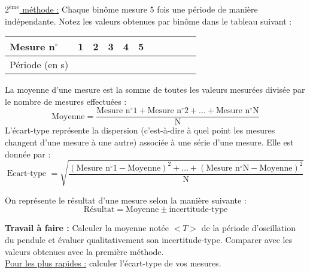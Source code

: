 \underline{$2^{\text{ème}}$ méthode :} Chaque binôme mesure 5 fois une période de manière indépendante. Notez les valeurs obtenues par binôme dans le tableau suivant :
\\

\begin{tabular}{|l|C{0.14}|C{0.14}|C{0.14}|C{0.14}|C{0.14}|C{0.14}|C{0.14}|C{0.14}|C{0.14}|C{0.14}|}
\hline
     Mesure n$^{\circ}$ & 1 & 2 & 3 & 4 & 5 \\
     \hline
     Période (en s) & & & & & \\
     \hline
\end{tabular}
\newline
\newline

\begin{tcolorbox}[colback=blue!5!white,colframe=white!75!black,title=Document 1 :]
La moyenne d'une mesure est la somme de toutes les valeurs mesurées divisée par le nombre de mesures effectuées :
\begin{equation*}
    \text{Moyenne} = \frac{\text{Mesure n$^{\circ}$1}+\text{Mesure n$^{\circ}$2} + ... + \text{Mesure n$^{\circ}$N}}{\text{N}}
\end{equation*}
L'écart-type représente la dispersion (c'est-à-dire à quel point les mesures changent d'une mesure à une autre) associée à une série d'une mesure. Elle est donnée par :
\begin{equation*}
    \text{Ecart-type }= \sqrt{\frac{\left(\text{Mesure n$^{\circ}$1}-\text{Moyenne}\right)^2+...+\left(\text{Mesure n$^{\circ}$N}-\text{Moyenne}\right)^2}{\text{N}}}
\end{equation*}
\end{tcolorbox}

\begin{tcolorbox}[colback=blue!5!white,colframe=white!75!black,title=Document 2 :]
On représente le résultat d'une mesure selon la manière suivante :
\begin{equation*}
    \text{Résultat} = \text{Moyenne} \pm \text{incertitude-type}
\end{equation*}
\end{tcolorbox}
\textbf{Travail à faire :} Calculer la moyenne notée $<T>$ de la période d'oscillation du pendule et évaluer qualitativement son incertitude-type. Comparer avec les valeurs obtenues avec la première méthode.\\
\underline{Pour les plus rapides :} calculer l'écart-type de vos mesures.

\newpage

